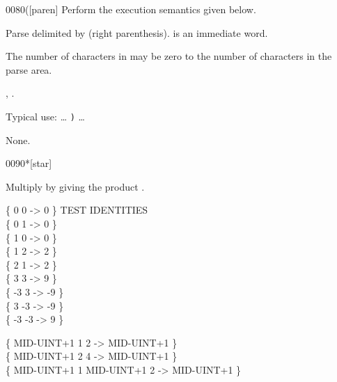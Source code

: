 \begin{worddef}[p]{0080}{(}[paren]
\compile
	Perform the execution semantics given below.

\execute

	Parse  delimited by  (right parenthesis).
	 is an immediate word.

	The number of characters in  may be zero to the
	number of characters in the parse area.

\see {},
	.

	\begin{defer}
	\rationale %
		Typical use: {\ldots}  \texttt{)} {\ldots}

	\testing* None.
	\end{defer}
\end{worddef}


\begin{worddef}{0090}{*}[star]
\item {}

	Multiply  by  giving the product
	\param{n_3|u_3}.

	\begin{defer}
	\testing
		\{  0  0 \word{*} ->  0 \} \tab[4]  TEST IDENTITIE{\bs}S \\
		\{  0  1 \word{*} ->  0 \} \\
		\{  1  0 \word{*} ->  0 \} \\
		\{  1  2 \word{*} ->  2 \} \\
		\{  2  1 \word{*} ->  2 \} \\
		\{  3  3 \word{*} ->  9 \} \\
		\{ -3  3 \word{*} -> -9 \} \\
		\{  3 -3 \word{*} -> -9 \} \\
		\{ -3 -3 \word{*} ->  9 \}

		\{ MID-UINT+1 1  2 \word{*} -> MID-UINT+1 \} \\
		\{ MID-UINT+1 2  4 \word{*} -> MID-UINT+1 \} \\
		\{ MID-UINT+1 1  MID-UINT+1  2 \word{*} -> MID-UINT+1 \} \\
	\end{defer}
\end{worddef}


